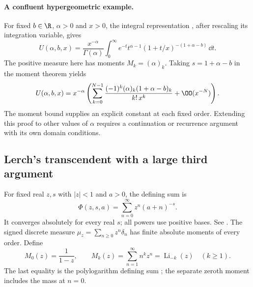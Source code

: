 \paragraph{A confluent hypergeometric example.}
For fixed $b\in\R$, $\alpha>0$ and $x>0$, the integral representation
\cite[(13.4.4)]{dlmf}, after rescaling its integration variable, gives
\[
 U(\alpha,b,x)=\frac{x^{-\alpha}}{\Gamma(\alpha)}
     \int_0^\infty e^{-t}t^{\alpha-1}
                      (1+t/x)^{-(1+\alpha-b)}\,\dd t.
\]
The positive measure here has moments
$M_k=(\alpha)_k$. Taking $s=1+\alpha-b$ in the moment theorem yields
\begin{equation}
 U(\alpha,b,x)=x^{-\alpha}
   \left(\sum_{k=0}^{N-1}
        \frac{(-1)^k(\alpha)_k(1+\alpha-b)_k}{k!\,x^k}
          +\OO(x^{-N})\right).
 \label{eq:special-function-tricomi-moments}
\end{equation}
The moment bound supplies an explicit constant at each fixed order.
Extending this proof to other values of $\alpha$ requires a
continuation or recurrence argument with its own domain conditions.

\subsection{Lerch's transcendent with a large third argument}

For fixed real $z,s$ with $|z|<1$ and $a>0$, the defining sum is
\begin{equation}
 \Phi(z,s,a)=\sum_{n=0}^\infty z^n(a+n)^{-s}.
 \label{eq:special-function-lerch-definition}
\end{equation}
It converges absolutely for every real $s$; all powers use positive
bases. See \cite[(25.14.1)]{dlmf}. The signed discrete measure
$\mu_z=\sum_{n\ge0}z^n\delta_n$ has finite absolute moments of every
order. Define
\begin{equation}
 M_0(z)=\frac1{1-z},\qquad
 M_k(z)=\sum_{n=1}^\infty n^kz^n
       =\operatorname{Li}_{-k}(z)\quad(k\ge1).
 \label{eq:special-function-lerch-moments}
\end{equation}
The last equality is the polylogarithm defining sum
\cite[(25.12.10)]{dlmf}; the separate zeroth moment includes the
mass at $n=0$.


